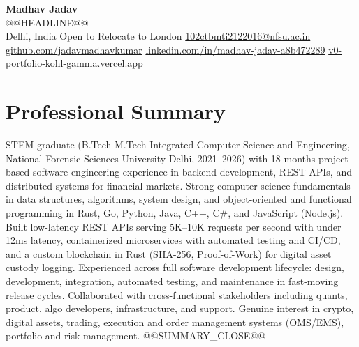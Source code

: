 \documentclass[9pt,letterpaper]{article}
\begin{document}
\begin{center}
{\LARGE \textbf{Madhav Jadav}}\\[2pt]
{\small @@HEADLINE@@}\\[2pt]
{\small Delhi, India \textbar{} Open to Relocate to London \textbar{} \href{mailto:102ctbmti2122016@nfsu.ac.in}{102ctbmti2122016@nfsu.ac.in}}\\[2pt]
{\small \href{https://github.com/jadavmadhavkumar}{github.com/jadavmadhavkumar} \textbar{} \href{https://www.linkedin.com/in/madhav-jadav-a8b472289}{linkedin.com/in/madhav-jadav-a8b472289} \textbar{} \href{http://v0-portfolio-kohl-gamma.vercel.app}{v0-portfolio-kohl-gamma.vercel.app}}\\
\end{center}

\section{Professional Summary}
STEM graduate (B.Tech-M.Tech Integrated Computer Science and Engineering, National Forensic Sciences University Delhi, 2021--2026) with 18 months project-based software engineering experience in backend development, REST APIs, and distributed systems for financial markets. Strong computer science fundamentals in data structures, algorithms, system design, and object-oriented and functional programming in Rust, Go, Python, Java, C++, C\#, and JavaScript (Node.js). Built low-latency REST APIs serving 5K--10K requests per second with under 12ms latency, containerized microservices with automated testing and CI/CD, and a custom blockchain in Rust (SHA-256, Proof-of-Work) for digital asset custody logging. Experienced across full software development lifecycle: design, development, integration, automated testing, and maintenance in fast-moving release cycles. Collaborated with cross-functional stakeholders including quants, product, algo developers, infrastructure, and support. Genuine interest in crypto, digital assets, trading, execution and order management systems (OMS/EMS), portfolio and risk management. @@SUMMARY_CLOSE@@

\end{document}
